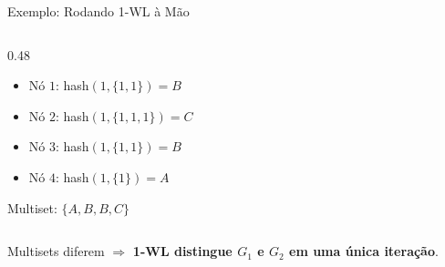 \documentclass[aspectratio=169,xcolor=dvipsnames]{beamer}
\begin{document}
\begin{frame}{Exemplo: Rodando 1-WL à Mão}
\begin{columns}[T]
\begin{column}{0.48\textwidth}
\begin{itemize}
          \item Nó $1$: hash$(1, \{1,1\}) = B$
          \item Nó $2$: hash$(1, \{1,1,1\}) = C$
          \item Nó $3$: hash$(1, \{1,1\}) = B$
          \item Nó $4$: hash$(1, \{1\}) = A$
        \end{itemize}
        Multiset: $\{A, B, B, C\}$
      \end{column}
    \end{columns}
    \vspace{0.3em}
    Multisets diferem $\Rightarrow$ \textbf{1-WL distingue $G_1$ e $G_2$ em uma única iteração}.
  \end{frame}
\end{document}
